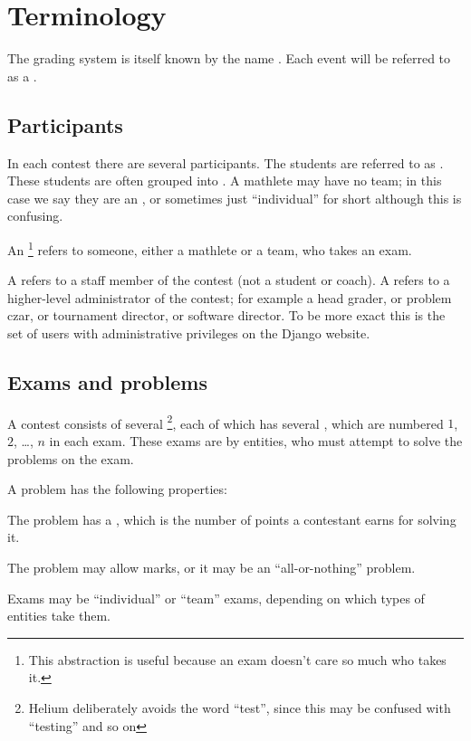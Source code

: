 \chapter{Terminology}
\label{ch:terms}

The grading system is itself known by the name .
Each event will be referred to as a .

\section{Participants}
In each contest there are several participants.
The students are referred to as .
These students are often grouped into .
A mathlete may have no team; in this case we say they
are an ,
or sometimes just ``individual'' for short although this is confusing.

An \footnote{%
	This abstraction is useful because an exam doesn't care so much who takes it.}
refers to someone,
either a mathlete or a team,
who takes an exam.

A  refers to a staff member of the contest
(not a student or coach).
A  refers to a higher-level administrator of the contest;
for example a head grader, or problem czar,
or tournament director, or software director.
To be more exact this is the set of users with administrative
privileges on the Django website.

\section{Exams and problems}
A contest consists of several \footnote{%
	Helium deliberately avoids the word ``test'',
	since this may be confused with ``testing'' and so on},
each of which has several ,
which are numbered $1$, $2$, \dots, $n$ in each exam.
These exams are  by entities,
who must attempt to solve the problems on the exam.

A problem has the following properties:
\begin{itemize}
	\ii The problem has a ,
	which is the number of points a contestant earns for solving it.

	\ii The problem may allow  marks,
	or it may be an ``all-or-nothing'' problem.
\end{itemize}
Exams may be ``individual'' or ``team'' exams,
depending on which types of entities take them.

